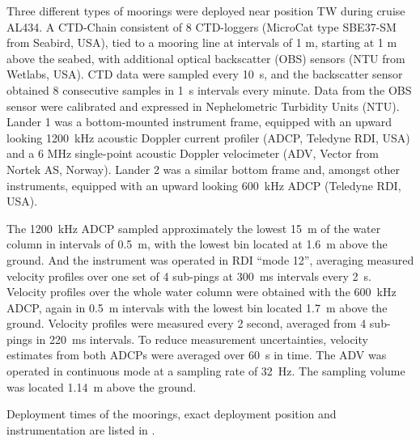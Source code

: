 Three different types of moorings were deployed near position TW during cruise 
AL434. A CTD-Chain consistent of 8 CTD-loggers (MicroCat type SBE37-SM from 
Seabird, USA), tied to a mooring line at intervals of 1 m, starting at 1 m above 
the seabed, with additional optical backscatter (OBS) sensors (NTU from 
Wetlabs, USA). CTD data were sampled every 10~s, and the backscatter sensor 
obtained 8 consecutive samples in 1~s intervals every minute. Data from the OBS 
sensor were calibrated and expressed in Nephelometric Turbidity Units (NTU).
Lander 1 was a bottom-mounted instrument frame, equipped with an upward looking 
1200~kHz acoustic Doppler current profiler (ADCP, Teledyne RDI, USA) and a 6 
MHz single-point acoustic Doppler velocimeter (ADV, Vector from Nortek AS, 
Norway).
Lander 2 was a similar bottom frame and, amongst other instruments, equipped 
with an upward looking 600~kHz ADCP (Teledyne RDI, USA).

The 1200~kHz ADCP sampled approximately the lowest 15~m of the water column in 
intervals of 0.5~m, with the lowest bin located at 1.6~m above the ground. 
And the instrument was operated in RDI ``mode 12'', 
averaging measured velocity profiles over one set of 4 sub-pings at 300~ms 
intervals every 2~s. 
Velocity profiles over the whole water column were 
obtained with the 600~kHz ADCP, again in 0.5~m intervals with the lowest bin 
located 1.7~m above the ground. Velocity profiles were measured every 2 second, 
averaged from 4 sub-pings in 220~ms intervals. To reduce measurement 
uncertainties, velocity estimates from both ADCPs were averaged over 60~s in 
time. 
The ADV was operated in continuous mode at a sampling rate of 32~Hz. The 
sampling volume was located 1.14~m above the ground.

Deployment times of the moorings, exact deployment position and instrumentation 
are listed in .


